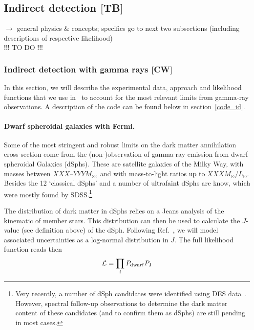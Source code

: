 \subsection{Indirect detection {\bf [TB]}}
\label{phys_id}

$\to$ general physics \& concepts; specifics go to next two subsections 
(including descriptions of respective likelihood)\\

\smallskip
{\color{red} !!! TO DO !!!}
\smallskip


\subsubsection{Indirect detection with gamma rays {\bf [CW]}}
\label{phys_ga}

In this section, we will describe the experimental data, approach and
likelihood functions that we use in \GB\ to account for the most relevant
limits from gamma-ray observations.  A description of the code can be found
below in section~\ref{code_id}.

\paragraph{Dwarf spheroidal galaxies with Fermi.}
Some of the most stringent and robust limits on the dark matter annihilation
cross-section come from the (non-)observation of gamma-ray emission from dwarf
spheroidal Galaxies (dSphs).  These are satellite galaxies of the Milky Way,
with masses between $XXX$--$YYY M_\odot$, and with mass-to-light ratios up to
$XXX M_\odot/L_\odot$.  Besides the 12 `classical dSphs' and a number of
ultrafaint dSphs are know, which were mostly found by SDSS.\footnote{Very
recently, a number of dSph candidates were identified using DES
data~\cite{123}.  However, spectral follow-up observations to
determine the dark matter content of these candidates (and to
confirm them as dSphs) are still pending in most cases.}  

The distribution of dark matter in dSphs relies on a Jeans analysis of the
kinematic of member stars.  This distribution can then be used to calculate the
$J$-value (see definition above) of the dSph.  Following
Ref.~\cite{FermiDwarfs}, we will model associated uncertainties as a log-normal
distribution in $J$.  The full likelihood function reads then
%
\begin{equation}
  \mathcal{L} = \prod_i P_{\rm dwarf} P_{\rm J}
\end{equation}
%

